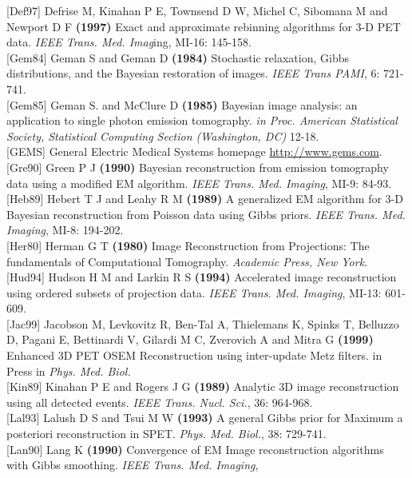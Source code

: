 \documentclass{article}
\begin{document}
{[}Def97{]} Defrise M, Kinahan P E, Townsend D W, Michel C, Sibomana 
M and Newport D F \textbf{(1997)} Exact and approximate rebinning 
algorithms for 3-D PET data. \textit{IEEE Trans. Med. Imag}ing, MI-16: 
145-158.\\
{[}Gem84{]} Geman S and Geman D \textbf{(1984)} Stochastic relaxation, 
Gibbs distributions, and the Bayesian restoration of images. \textit{IEEE 
Trans PAMI}, 6: 721-741.\\
{[}Gem85{]} Geman S. and McClure D \textbf{(1985)} Bayesian image analysis: 
an application to single photon emission tomography. \textit{in Proc. 
American Statistical Society, Statistical Computing Section (Washington, 
DC)} 12-18.\\
{[}GEMS{]} General Electric Medical Systems homepage {\underline {http://www.gems.com}}.\\
{[}Gre90{]} Green P J \textbf{(1990)} Bayesian reconstruction from emission 
tomography data using a modified EM algorithm. \textit{IEEE Trans. 
Med. Imaging}, MI-9: 84-93.\\
{[}Heb89{]} Hebert T J and Leahy R M \textbf{(1989)} A generalized EM 
algorithm for 3-D Bayesian reconstruction from Poisson data using 
Gibbs priors. \textit{IEEE Trans. Med. Imaging}, MI-8: 194-202.\\
{[}Her80{]} Herman G T \textbf{(1980)} Image Reconstruction from Projections: 
The fundamentals of Computational Tomography. \textit{Academic Press, 
New York}.\\
{[}Hud94{]} Hudson H M and Larkin R S \textbf{(1994)} Accelerated image 
reconstruction using ordered subsets of projection data. \textit{IEEE 
Trans. Med. Imaging}, MI-13: 601-609.\\
{[}Jac99{]} Jacobson M, Levkovitz R, Ben-Tal A, Thielemans K, Spinks 
T, Belluzzo D, Pagani E, Bettinardi V, Gilardi M C, Zverovich 
A and Mitra G \textbf{(1999)} Enhanced 3D PET OSEM Reconstruction 
using inter-update Metz filters. in Press in \textit{Phys. Med. Biol.}\\
{[}Kin89{]} Kinahan P E and Rogers J G \textbf{(1989)} Analytic 3D image 
reconstruction using all detected events. \textit{IEEE Trans. Nucl. 
Sci.}, 36: 964-968. \\
{[}Lal93{]} Lalush D S and Tsui M W \textbf{(1993)} A general Gibbs prior 
for Maximum a posteriori reconstruction in SPET. \textit{Phys. Med. 
Biol.}, 38: 729-741.\\
{[}Lan90{]} Lang K \textbf{(1990)} Convergence of EM Image reconstruction 
algorithms with Gibbs smoothing. \textit{IEEE Trans. Med. Imaging}, 
\end{document}
